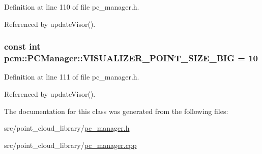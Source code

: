 Definition at line 110 of file pc\-\_\-manager.\-h.



Referenced by update\-Visor().

\hypertarget{classpcm_1_1PCManager_a53820f1bdb5fc94830c0a04334916d12}{
\subsubsection[{V\-I\-S\-U\-A\-L\-I\-Z\-E\-R\-\_\-\-P\-O\-I\-N\-T\-\_\-\-S\-I\-Z\-E\-\_\-\-B\-I\-G}]{\setlength{\rightskip}{0pt plus 5cm}const int pcm\-::\-P\-C\-Manager\-::\-V\-I\-S\-U\-A\-L\-I\-Z\-E\-R\-\_\-\-P\-O\-I\-N\-T\-\_\-\-S\-I\-Z\-E\-\_\-\-B\-I\-G = 10\hspace{0.3cm}{\ttfamily [static]}}}\label{classpcm_1_1PCManager_a53820f1bdb5fc94830c0a04334916d12}


Definition at line 111 of file pc\-\_\-manager.\-h.



Referenced by update\-Visor().



The documentation for this class was generated from the following files\-:\begin{DoxyCompactItemize}
\item 
src/point\-\_\-cloud\-\_\-library/\hyperlink{pc__manager_8h}{pc\-\_\-manager.\-h}\item 
src/point\-\_\-cloud\-\_\-library/\hyperlink{pc__manager_8cpp}{pc\-\_\-manager.\-cpp}\end{DoxyCompactItemize}
